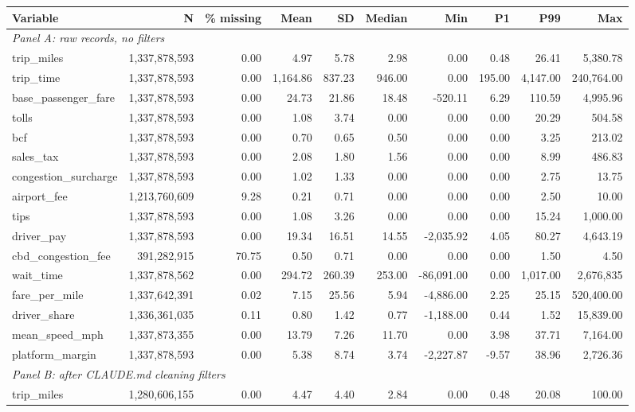 \begin{tabular}{lrrrrrrrrr}
\toprule
Variable & N & \% missing & Mean & SD & Median & Min & P1 & P99 & Max \\
\midrule
\multicolumn{10}{l}{\emph{Panel A: raw records, no filters}} \\
trip\_miles & 1,337,878,593 & 0.00 & 4.97 & 5.78 & 2.98 & 0.00 & 0.48 & 26.41 & 5,380.78 \\
trip\_time & 1,337,878,593 & 0.00 & 1,164.86 & 837.23 & 946.00 & 0.00 & 195.00 & 4,147.00 & 240,764.00 \\
base\_passenger\_fare & 1,337,878,593 & 0.00 & 24.73 & 21.86 & 18.48 & -520.11 & 6.29 & 110.59 & 4,995.96 \\
tolls & 1,337,878,593 & 0.00 & 1.08 & 3.74 & 0.00 & 0.00 & 0.00 & 20.29 & 504.58 \\
bcf & 1,337,878,593 & 0.00 & 0.70 & 0.65 & 0.50 & 0.00 & 0.00 & 3.25 & 213.02 \\
sales\_tax & 1,337,878,593 & 0.00 & 2.08 & 1.80 & 1.56 & 0.00 & 0.00 & 8.99 & 486.83 \\
congestion\_surcharge & 1,337,878,593 & 0.00 & 1.02 & 1.33 & 0.00 & 0.00 & 0.00 & 2.75 & 13.75 \\
airport\_fee & 1,213,760,609 & 9.28 & 0.21 & 0.71 & 0.00 & 0.00 & 0.00 & 2.50 & 10.00 \\
tips & 1,337,878,593 & 0.00 & 1.08 & 3.26 & 0.00 & 0.00 & 0.00 & 15.24 & 1,000.00 \\
driver\_pay & 1,337,878,593 & 0.00 & 19.34 & 16.51 & 14.55 & -2,035.92 & 4.05 & 80.27 & 4,643.19 \\
cbd\_congestion\_fee & 391,282,915 & 70.75 & 0.50 & 0.71 & 0.00 & 0.00 & 0.00 & 1.50 & 4.50 \\
wait\_time & 1,337,878,562 & 0.00 & 294.72 & 260.39 & 253.00 & -86,091.00 & 0.00 & 1,017.00 & 2,676,835 \\
fare\_per\_mile & 1,337,642,391 & 0.02 & 7.15 & 25.56 & 5.94 & -4,886.00 & 2.25 & 25.15 & 520,400.00 \\
driver\_share & 1,336,361,035 & 0.11 & 0.80 & 1.42 & 0.77 & -1,188.00 & 0.44 & 1.52 & 15,839.00 \\
mean\_speed\_mph & 1,337,873,355 & 0.00 & 13.79 & 7.26 & 11.70 & 0.00 & 3.98 & 37.71 & 7,164.00 \\
platform\_margin & 1,337,878,593 & 0.00 & 5.38 & 8.74 & 3.74 & -2,227.87 & -9.57 & 38.96 & 2,726.36 \\
\multicolumn{10}{l}{\emph{Panel B: after CLAUDE.md cleaning filters}} \\
trip\_miles & 1,280,606,155 & 0.00 & 4.47 & 4.40 & 2.84 & 0.00 & 0.48 & 20.08 & 100.00 \\

\end{tabular}
